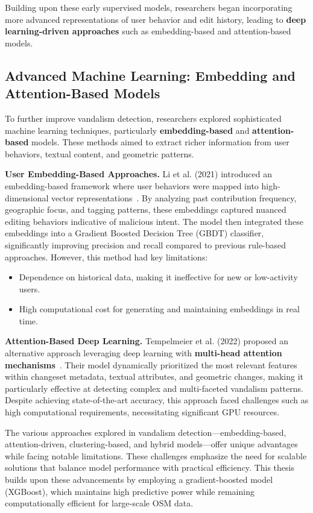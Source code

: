 \documentclass[
    13pt, %
    a4paper, %
    listof=totoc, %
    bibliography=totoc, %
    index=totoc, %
    headsepline
]{scrreprt}
\begin{document}
Building upon these early supervised models, researchers began incorporating more advanced representations of user behavior and edit history, leading to \textbf{deep learning-driven approaches} such as embedding-based and attention-based models.

\subsection{Advanced Machine Learning: Embedding and Attention-Based Models}
\label{sec:advanced_ml_methods}

To further improve vandalism detection, researchers explored sophisticated machine learning techniques, particularly \textbf{embedding-based} and \textbf{attention-based} models. These methods aimed to extract richer information from user behaviors, textual content, and geometric patterns.

\textbf{User Embedding-Based Approaches.}
Li et al. (2021) introduced an embedding-based framework where user behaviors were mapped into high-dimensional vector representations~\cite{Li2021}. By analyzing past contribution frequency, geographic focus, and tagging patterns, these embeddings captured nuanced editing behaviors indicative of malicious intent. The model then integrated these embeddings into a Gradient Boosted Decision Tree (GBDT) classifier, significantly improving precision and recall compared to previous rule-based approaches. However, this method had key limitations:
\begin{itemize}
    \item Dependence on historical data, making it ineffective for new or low-activity users.
    \item High computational cost for generating and maintaining embeddings in real time.
\end{itemize}

\textbf{Attention-Based Deep Learning.}
Tempelmeier et al. (2022) proposed an alternative approach leveraging deep learning with \textbf{multi-head attention mechanisms}~\cite{Tempelmeier2022}. Their model dynamically prioritized the most relevant features within changeset metadata, textual attributes, and geometric changes, making it particularly effective at detecting complex and multi-faceted vandalism patterns. Despite achieving state-of-the-art accuracy, this approach faced challenges such as high computational requirements, necessitating significant GPU resources.

\vspace{1em}
\noindent
The various approaches explored in vandalism detection—embedding-based, attention-driven, clustering-based, and hybrid models—offer unique advantages while facing notable limitations.
These challenges emphasize the need for scalable solutions that balance model performance with practical efficiency. This thesis builds upon these advancements by employing
a gradient-boosted model (XGBoost), which maintains high predictive power while remaining computationally efficient for large-scale OSM data.
\end{document}
